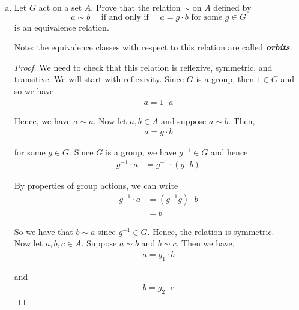 \documentclass[11pt, reqno]{amsart}
\theoremstyle{plain}
\theoremstyle{definition}
\theoremstyle{example}
\begin{document}
\begin{enumerate}[1.]
\begin{enumerate}[(a)]
\begin{proof}
We also have,
\begin{align*}
1 \cdot a &= \{1 \cdot a_1, \cdots 1 \cdot a_k\}\\
&= \{a_1, \cdots, a_k\}\\
&= a
\end{align*}

Hence, this action satisfies the axioms of group actions.
\end{proof}

\item 
 Let $G$ act on a set $A$. Prove that the relation $\sim$ on $A$ defined by 
$$a \sim b \quad  \text{ if and only if } \quad  a = g \cdot b \text{ for some } g \in G$$
is an equivalence relation. 

\smallskip

Note: the equivalence classes with respect to this relation are called \emph{\bf orbits}.

\begin{proof}
We need to check that this relation is reflexive, symmetric, and transitive. We will start with reflexivity. Since $G$ is a group, then $1 \in G$ and so we have 
\begin{align*}
a = 1 \cdot a
\end{align*}

Hence, we have $a \sim a$. Now let $a, b \in A$ and suppose $a \sim b$. Then,
\begin{align*}
a = g \cdot b
\end{align*}

for some $g \in G$. Since $G$ is a group, we have $g^{-1} \in G$ and hence
\begin{align*}
g^{-1} \cdot a &= g^{-1} \cdot (g \cdot b)
\end{align*}

By properties of group actions, we can write
\begin{align*}
g^{-1} \cdot a &= (g^{-1}g) \cdot b\\
&= b
\end{align*}

So we have that $b \sim a$ since $g^{-1} \in G$. Hence, the relation is symmetric.\\

Now let $a, b, c \in A$. Suppose $a \sim b$ and $b \sim c$. Then we have,
\begin{align*}
a = g _1 \cdot b
\end{align*}

and 
\begin{align*}
b = g_2 \cdot c
\end{align*}


\end{proof}
\end{enumerate}
\end{enumerate}
\end{document}

